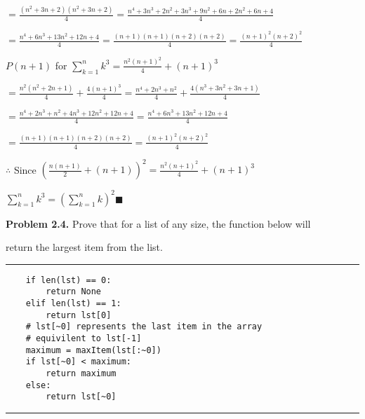 \documentclass{article}
\begin{document}
\vspace{0.5cm}

$= \frac{(n^2+3n+2)(n^2+3n+2)}{4} = \frac{n^4+3n^3+2n^2+3n^3+9n^2+6n+2n^2+6n+4}{4}$

\vspace{0.5cm}

$= \frac{n^4+6n^3+13n^2+12n+4}{4} = \frac{(n+1)(n+1)(n+2)(n+2)}{4} = \frac{(n+1)^2(n+2)^2}{4}$

\vspace{1.2cm}

$P(n+1)$ for $\displaystyle\sum_{k=1}^{n} k^3 = \frac{n^2(n+1)^2}{4} + (n+1)^3$

$= \frac{n^2(n^2+2n+1)}{4} + \frac{4(n+1)^3}{4} = \frac{n^4+2n^3+n^2}{4} + \frac{4(n^3+3n^2+3n+1)}{4}$

\vspace{0.3cm}

$= \frac{n^4+2n^3+n^2+4n^3+12n^2+12n+4}{4} = \frac{n^4+6n^3+13n^2+12n+4}{4}$

\vspace{0.3cm}

$= \frac{(n+1)(n+1)(n+2)(n+2)}{4} = \frac{(n+1)^2(n+2)^2}{4}$

\vspace{0.3cm}

$\therefore $ Since $ \left(\frac{n(n+1)}{2} + (n+1) \right)^2 = \frac{n^2(n+1)^2}{4} + (n+1)^3 $ 

$\displaystyle\sum_{k=1}^{n} k^3 = \left( \displaystyle\sum_{k=1}^{n} k \right)^2 \blacksquare $

\vspace{3.2cm}

\textbf{Problem 2.4.} Prove that for a list of any size, the function below will 

return the largest item from the list.

\vspace{0.5cm}

\hrule

\begin{verbatim}
    if len(lst) == 0:
        return None
    elif len(lst) == 1:
        return lst[0]
    # lst[~0] represents the last item in the array
    # equivilent to lst[-1]
    maximum = maxItem(lst[:~0])
    if lst[~0] < maximum:
        return maximum
    else:
        return lst[~0]
\end{verbatim}

\hrule

\vspace{0.5cm}
\end{document}
